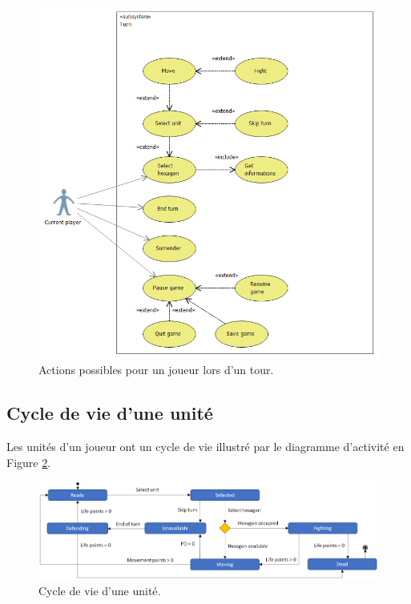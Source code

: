 		\begin{figure}
			\begin{center}
				\includegraphics[width=1\textwidth]{figure/cas_utilisation_player_turn.png}
			\end{center}
			\caption{Actions possibles pour un joueur lors d'un tour.}
			\label{fig:use2}
		\end{figure}

	\subsection{Cycle de vie d'une unité}

	Les unités d'un joueur ont un cycle de vie illustré par le diagramme d'activité en {\sc Figure} \ref{fig:arbre_exemple_1}.


	\begin{figure}[h]
	            \centering
	            \includegraphics[width=1\textwidth]{figure/unit_life_cycle_state_diagram.png}
	            \caption{Cycle de vie d'une unité.}
	            \label{fig:arbre_exemple_1}
	\end{figure}